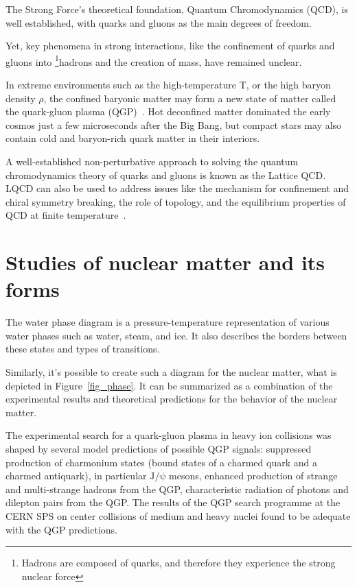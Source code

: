 \newpage

The Strong Force's theoretical foundation, Quantum Chromodynamics (QCD), is well established, with quarks and gluons as the main degrees of freedom.

Yet, key phenomena in strong interactions, like the confinement of quarks and gluons into \footnote{Hadrons are composed of quarks, and therefore they experience the strong nuclear force}{hadrons} and the creation of mass, have remained unclear.

In extreme environments such as the high-temperature T, or the high baryon density $\rho$, the confined baryonic matter may form a new state of matter called the quark-gluon plasma (\gls{QGP})~\cite{phase_diagram}. Hot deconfined matter dominated the early cosmos just a few microseconds after the Big Bang, but compact stars may also contain cold and baryon-rich quark matter in their interiors.

A well-established non-perturbative approach to solving the quantum chromodynamics theory of quarks and gluons is known as the Lattice \gls{QCD}. LQCD can also be used to address issues like the mechanism for confinement and chiral symmetry breaking, the role of topology, and the equilibrium properties of \gls{QCD} at finite temperature~\cite{lattice_qcd}. 

\section{Studies of nuclear matter and its forms}
The water phase diagram is a pressure-temperature representation of various water phases such as water, steam, and ice. It also describes the borders between these states and types of transitions. 

Similarly, it's possible to create such a diagram for the nuclear matter, what is depicted in Figure~\ref{fig_phase}. It can be summarized as a combination of the experimental results and theoretical predictions for the behavior of the nuclear matter.

The experimental search for a quark-gluon plasma in heavy ion
collisions was shaped by several model predictions of possible \gls{QGP} signals: suppressed production of charmonium states (bound states of a charmed quark and a charmed antiquark), in particular $\mathrm{J/\psi}$ mesons, enhanced production of strange and multi-strange hadrons from the \gls{QGP}, characteristic radiation of photons and dilepton pairs from the \gls{QGP}. The results of the QGP search programme at the \gls{CERN} \gls{SPS} on center collisions of medium and heavy nuclei found to be adequate with the QGP predictions.

